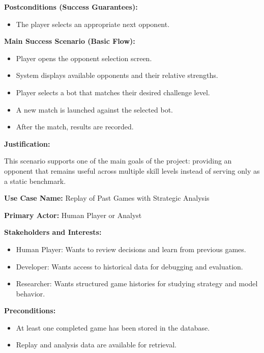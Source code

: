 \documentclass{article}
\begin{document}
\noindent\textbf{Postconditions (Success Guarantees):}
\begin{itemize}
    \item The player selects an appropriate next opponent.
\end{itemize}

\noindent\textbf{Main Success Scenario (Basic Flow):}
\begin{itemize}
    \item Player opens the opponent selection screen.
    \item System displays available opponents and their relative strengths.
    \item Player selects a bot that matches their desired challenge level.
    \item A new match is launched against the selected bot.
    \item After the match, results are recorded.
\end{itemize}

\noindent\textbf{Justification:}

This scenario supports one of the main goals of the project: providing an \AI{} opponent that remains useful across multiple skill levels instead of serving only as a static benchmark.

\vspace{1em}

\noindent\textbf{Use Case Name:} Replay of Past Games with Strategic Analysis

\noindent\textbf{Primary Actor:} Human Player or Analyst

\noindent\textbf{Stakeholders and Interests:}
\begin{itemize}
    \item Human Player: Wants to review decisions and learn from previous games.
    \item Developer: Wants access to historical data for debugging and evaluation.
    \item Researcher: Wants structured game histories for studying strategy and model behavior.
\end{itemize}

\noindent\textbf{Preconditions:}
\begin{itemize}
    \item At least one completed game has been stored in the database.
    \item Replay and analysis data are available for retrieval.
\end{itemize}
\end{document}
